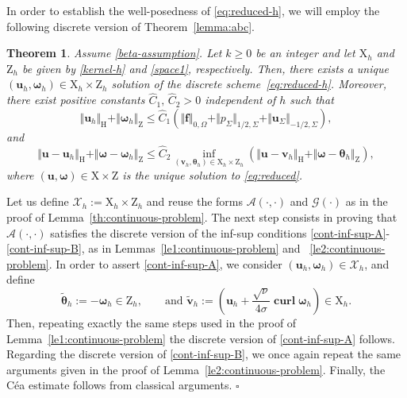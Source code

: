 \documentclass[reqno,a4paper]{article}
\numberwithin{equation}{section}
\newcommand\ff{\boldsymbol{f}}
\newcommand\bu{\boldsymbol{u}}
\newcommand\bv{\boldsymbol{v}}
\renewcommand\O{\Omega}
\renewcommand\H{\mathrm{H}}
\newcommand\Z{\mathrm{Z}}
\newcommand\X{\mathrm{X}}
\newcommand\bomega{\boldsymbol{\omega}}
\newcommand\btheta{\boldsymbol{\theta}}
\newtheorem{theorem}{Theorem}[section]
\newcommand\curl{\mathop{\mathbf{curl}}\nolimits}
\newenvironment{proof}{\noindent{\it Proof.}}{\hfill$\square$}
\begin{document}
In order to establish the well-posedness of \eqref{eq:reduced-h},
we will employ the following discrete version of Theorem~\ref{lemma:abc}.

\begin{theorem}
Assume \eqref{beta-assumption}. 
Let $k\ge0$ be an integer and let $\X_h$ and $\Z_h$
be given by \eqref{kernel-h} and \eqref{space1}, respectively.
Then, there exists a unique $(\bu_h,\bomega_h)\in\X_h\times\Z_h$
solution of the discrete scheme~\eqref{eq:reduced-h}.
Moreover, there exist positive constants $\hat{C}_1,\,\hat{C}_2>0$
independent of $h$ such that
\begin{equation}\label{eq:stability-h}
\Vert\bu_h\Vert_{\H}+\Vert\bomega_h\Vert_{\Z}\le
\hat{C}_1(\Vert\ff\Vert_{0,\O}+\Vert p_{\Sigma}\Vert_{1/2,\Sigma}+\Vert 
\bu_{\Sigma}\Vert_{-1/2,\Sigma}),
\end{equation}
and
\begin{equation}\label{ceaest}
\Vert\bu-\bu_h\Vert_{\H}+\Vert\bomega-\bomega_h\Vert_{\Z}
\le\hat{C}_2\inf_{(\bv_h,\btheta_h)\in\X_h\times\Z_h}
(\Vert\bu-\bv_h\Vert_{\H}+\Vert\bomega-\btheta_h\Vert_{\Z}),
\end{equation}
where $(\bu,\bomega)\in\X\times\Z$ is the
unique solution to \eqref{eq:reduced}.
\end{theorem}

\begin{proof}
Let us define $\mathcal X_h:=\X_h\times\Z_h$ and reuse 
the forms $\mathcal A(\cdot,\cdot)$ and $\mathcal G(\cdot)$ 
as in the proof of Lemma~\ref{th:continuous-problem}. 
%
The next step consists in proving that 
$\mathcal A(\cdot,\cdot)$ satisfies the discrete version
of the inf-sup conditions \eqref{cont-inf-sup-A}-\eqref{cont-inf-sup-B}, 
as in Lemmas~\ref{le1:continuous-problem} and
~\ref{le2:continuous-problem}.
In order to assert \eqref{cont-inf-sup-A}, we consider
$(\bu_h,\bomega_h)\in\mathcal X_h$, and define 
$$\tilde{\btheta}_h:=-\bomega_h\in\Z_h,\qquad \text{and }
\tilde{\bv}_h:=(\bu_h+\frac{\sqrt{\nu}}{4\sigma}\curl\bomega_h)\in\X_h.$$
Then, repeating exactly the same steps used
in the proof of Lemma~\ref{le1:continuous-problem}
the discrete version of \eqref{cont-inf-sup-A} follows. Regarding 
the discrete version of \eqref{cont-inf-sup-B}, 
we once again repeat the same arguments
given in the proof of Lemma~\ref{le2:continuous-problem}.
Finally, the C\'ea estimate follows from classical arguments.
\end{proof}
\end{document}
